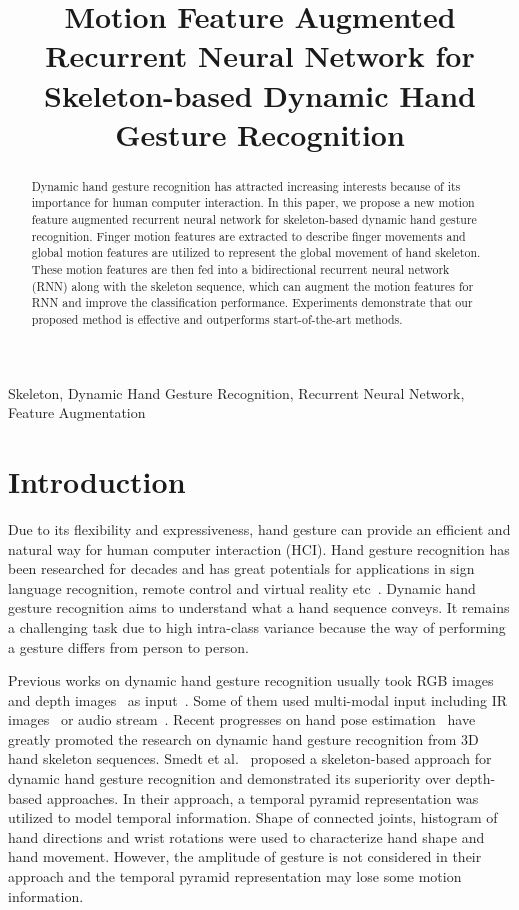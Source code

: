 \documentclass{article}
\title{Motion Feature Augmented Recurrent Neural Network for Skeleton-based Dynamic Hand Gesture Recognition}
\begin{document}
\maketitle
\begin{abstract}
Dynamic hand gesture recognition has attracted increasing interests because of its importance for human computer interaction. In this paper, we propose a new motion feature augmented recurrent neural network for skeleton-based dynamic hand gesture recognition.
Finger motion features are extracted to describe finger movements and global motion features are utilized to represent the global movement of hand skeleton. These motion features are then fed into a bidirectional recurrent neural network (RNN) along with the skeleton sequence, which can augment the motion features for RNN and improve the classification performance.
Experiments demonstrate that our proposed method is effective and outperforms start-of-the-art methods.

\end{abstract}
\begin{keywords}
Skeleton, Dynamic Hand Gesture Recognition, Recurrent Neural Network, Feature Augmentation
\end{keywords}
\section{Introduction}
\label{sec:intro}
Due to its flexibility and expressiveness, hand gesture can provide an efficient and natural way for human computer interaction (HCI). Hand gesture recognition has been researched for decades and has great potentials for applications in sign language recognition, remote control and virtual reality etc~\cite{mitra2007gesture,zeng2012hand,chen2016static,dong2015american,ohn2014hand,molchanov2016online,Neverova2016moddrop}.
Dynamic hand gesture recognition aims to understand what a hand sequence conveys. It remains a challenging task due to high intra-class variance because the way of performing a gesture differs from person to person.

Previous works on dynamic hand gesture recognition usually took RGB images and depth images~\cite{wang2013depth,shi2015high} as input~\cite{ohn2014hand}. Some of them used multi-modal input including IR images~\cite{molchanov2016online} or audio stream~\cite{Neverova2016moddrop}.
Recent progresses on hand pose estimation~\cite{supancic2015depth,oberweger2015training,tang2015opening,YeSpatialHandECCV2016}
have greatly promoted the research on dynamic hand gesture recognition from 3D hand skeleton sequences.
Smedt et al.~\cite{de2016skeleton} proposed a skeleton-based approach for dynamic hand gesture recognition and demonstrated its superiority over depth-based approaches. In their approach, a temporal pyramid representation was utilized to model temporal information. Shape of connected joints, histogram of hand directions and wrist rotations were used to characterize hand shape and hand movement. However, the amplitude of gesture is not considered in their approach and the temporal pyramid representation may lose some motion information.
\end{document}
